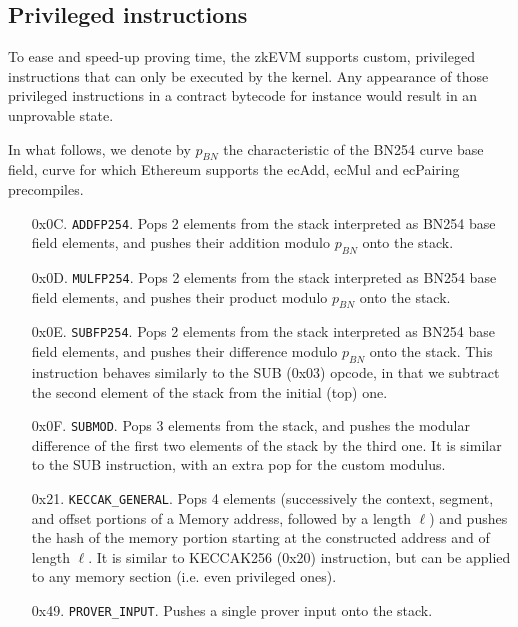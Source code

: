 \subsection{Privileged instructions}

To ease and speed-up proving time, the zkEVM supports custom, privileged instructions that can only be executed by the kernel.
Any appearance of those privileged instructions in a contract bytecode for instance would result in an unprovable state.

In what follows, we denote by $p_{BN}$ the characteristic of the BN254 curve base field, curve for which Ethereum supports the 
ecAdd, ecMul and ecPairing precompiles.

\begin{enumerate}[align=left]
  \item[0x0C.] \texttt{ADDFP254}. Pops 2 elements from the stack interpreted as BN254 base field elements, and pushes their addition modulo $p_{BN}$ onto the stack.

  \item[0x0D.] \texttt{MULFP254}. Pops 2 elements from the stack interpreted as BN254 base field elements, and pushes their product modulo $p_{BN}$ onto the stack.

  \item[0x0E.] \texttt{SUBFP254}. Pops 2 elements from the stack interpreted as BN254 base field elements, and pushes their difference modulo $p_{BN}$ onto the stack.
  This instruction behaves similarly to the SUB (0x03) opcode, in that we subtract the second element of the stack from the initial (top) one.

  \item[0x0F.] \texttt{SUBMOD}. Pops 3 elements from the stack, and pushes the modular difference of the first two elements of the stack by the third one.
  It is similar to the SUB instruction, with an extra pop for the custom modulus.

  \item[0x21.] \texttt{KECCAK\_GENERAL}. Pops 4 elements (successively the context, segment, and offset portions of a Memory address, followed by a length $\ell$)
  and pushes the hash of the memory portion starting at the constructed address and of length $\ell$. It is similar to KECCAK256 (0x20) instruction, but can be applied to
  any memory section (i.e. even privileged ones).

  \item[0x49.] \texttt{PROVER\_INPUT}. Pushes a single prover input onto the stack.


\end{enumerate}
